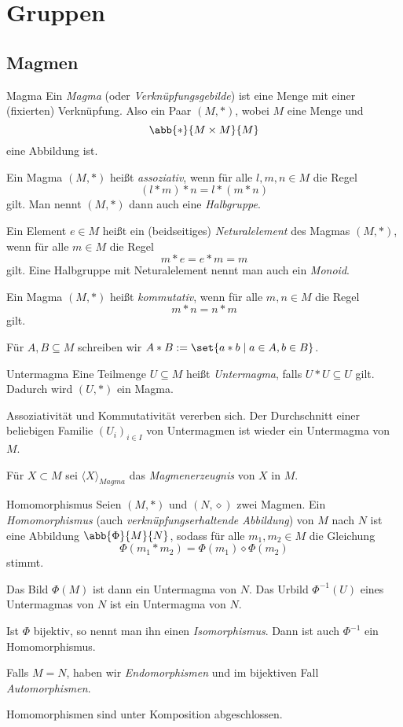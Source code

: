 \section{Gruppen}

\subsection{Magmen}

\begin{karte}{Magma}
    Ein \textit{Magma} (oder \textit{Verknüpfungsgebilde}) ist eine 
    Menge mit einer (fixierten) Verknüpfung. Also ein Paar \((M,*)\), 
    wobei \(M\) eine Menge und 
    \[ \abb{*}{M\times M}{M} \]
    eine Abbildung ist.

    Ein Magma \((M,*)\) heißt \textit{assoziativ}, wenn für alle 
    \(l,m,n\in M\) die Regel 
    \[ (l*m)*n=l*(m*n) \] 
    gilt. Man nennt \((M,*)\) dann auch eine \textit{Halbgruppe}.

    Ein Element \(e\in M\) heißt ein (beidseitiges) \textit{Neturalelement} 
    des Magmas \((M,*)\), wenn für alle \(m\in M\) die Regel 
    \[ m*e = e*m = m \]
    gilt. Eine Halbgruppe mit Neturalelement nennt man auch ein \textit{Monoid}.

    Ein Magma \((M,*)\) heißt \textit{kommutativ}, wenn für alle \(m,n\in M\) die 
    Regel 
    \[ m*n=n*m \] 
    gilt.

    Für \(A,B\subseteq M\) schreiben wir \(A*B := \set{a*b \;|\;a\in A, b\in B}\).
\end{karte}

\begin{karte}{Untermagma}
    Eine Teilmenge \(U \subseteq M\) heißt \textit{Untermagma}, falls 
    \(U*U\subseteq U\) gilt. Dadurch wird \((U,*)\) ein Magma.
    
    Assoziativität und Kommutativität vererben sich. 
    Der Durchschnitt einer beliebigen Familie \((U_i)_{i\in I}\) 
    von Untermagmen ist wieder ein Untermagma von \(M\).

    Für \(X \subset M\) sei \(\langle X \rangle_{Magma}\) das \textit{Magmenerzeugnis} von \(X\) in \(M\). 
\end{karte}

\begin{karte}{Homomorphismus}
    Seien \((M,*)\) und \((N,\diamond)\) zwei Magmen. 
    Ein \textit{Homomorphismus} (auch \textit{verknüpfungserhaltende Abbildung})
    von \(M\) nach \(N\) ist eine Abbildung \(\abb{\Phi}{M}{N}\), 
    sodass für alle \(m_1, m_2 \in M\) die Gleichung 
    \[ \Phi(m_1*m_2) = \Phi(m_1) \diamond \Phi(m_2) \]
    stimmt.

    Das Bild \(\Phi(M)\) ist dann ein Untermagma von \(N\). 
    Das Urbild \(\Phi^{-1}(U)\) eines Untermagmas von \(N\) ist ein Untermagma von \(N\).

    Ist \(\Phi\) bijektiv, so nennt man ihn einen \textit{Isomorphismus}. 
    Dann ist auch \(\Phi^{-1}\) ein Homomorphismus. 
    
    Falls \(M=N\), haben wir \textit{Endomorphismen} und im bijektiven 
    Fall \textit{Automorphismen}. 

    Homomorphismen sind unter Komposition abgeschlossen.
\end{karte}

